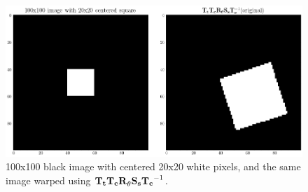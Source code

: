 \begin{figure}[H]
  \centering
  \includegraphics[width=\textwidth]{figures/task_2_2.png}
  \caption{100x100 black image with centered 20x20 white pixels, and the same
  image warped using $\mathbf{T_tT_cR}_\theta\mathbf{S_sT_c}^{-1}$.}
  \label{fig:task_2_2}
\end{figure}
